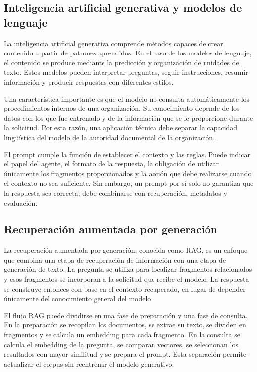 \subsection{Inteligencia artificial generativa y modelos de lenguaje}

La inteligencia artificial generativa comprende métodos capaces de crear contenido a partir de patrones aprendidos. En el caso de los modelos de lenguaje, el contenido se produce mediante la predicción y organización de unidades de texto. Estos modelos pueden interpretar preguntas, seguir instrucciones, resumir información y producir respuestas con diferentes estilos.

Una característica importante es que el modelo no consulta automáticamente los procedimientos internos de una organización. Su conocimiento depende de los datos con los que fue entrenado y de la información que se le proporcione durante la solicitud. Por esta razón, una aplicación técnica debe separar la capacidad lingüística del modelo de la autoridad documental de la organización.

El prompt cumple la función de establecer el contexto y las reglas. Puede indicar el papel del agente, el formato de la respuesta, la obligación de utilizar únicamente los fragmentos proporcionados y la acción que debe realizarse cuando el contexto no sea suficiente. Sin embargo, un prompt por sí solo no garantiza que la respuesta sea correcta; debe combinarse con recuperación, metadatos y evaluación.

\subsection{Recuperación aumentada por generación}

La recuperación aumentada por generación, conocida como RAG, es un enfoque que combina una etapa de recuperación de información con una etapa de generación de texto. La pregunta se utiliza para localizar fragmentos relacionados y esos fragmentos se incorporan a la solicitud que recibe el modelo. La respuesta se construye entonces con base en el contexto recuperado, en lugar de depender únicamente del conocimiento general del modelo \citep{lewis2020rag,gao2023rag}.

El flujo RAG puede dividirse en una fase de preparación y una fase de consulta. En la preparación se recopilan los documentos, se extrae su texto, se dividen en fragmentos y se calcula un embedding para cada fragmento. En la consulta se calcula el embedding de la pregunta, se comparan vectores, se seleccionan los resultados con mayor similitud y se prepara el prompt. Esta separación permite actualizar el corpus sin reentrenar el modelo generativo.

